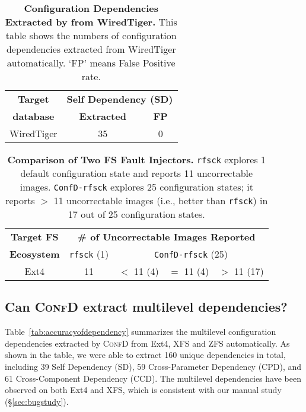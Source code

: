 \begin{table*}[t]
	\small
	\begin{center}
		\begin{tabular}{ c | c | c }
			\textbf{Target } & \multicolumn{2}{c}{\textbf{Self Dependency (SD)}} \\
            \cline{2-3}
		      \textbf{database} & \textbf{Extracted}  &  \textbf{FP}  \\
			\hline
            {WiredTiger}  & 35 & 0   \\
			\hline
		\end{tabular}
	\end{center}
	\caption{ {\bf  Configuration Dependencies Extracted by from WiredTiger.} This table shows the numbers of configuration dependencies extracted from WiredTiger automatically.  `FP' means False Positive rate.}
	\label{tab:wiredtigerdep}
\end{table*}



\begin{table}[t]
	\small
	\begin{center}
		\begin{tabular}{ c | c | c | c | c   }
 	\textbf{Target FS }  &  \multicolumn{4}{c}{\textbf{\# of Uncorrectable Images Reported}}    \\
          \cline{2-5}
           	\textbf{ Ecosystem  }  & {\texttt{rfsck} (1) }  & \multicolumn{3}{c}{{\texttt{ConfD-rfsck} (25)}  }    \\
\hline
Ext4  & 11  & $<$ 11 (4) & $=$ 11 (4) & $>$ 11 (17)   \\
			\hline
 
		\end{tabular}
	\end{center}
	\caption{ {\bf Comparison of Two FS Fault Injectors.} 
\texttt{rfsck} explores 1 default configuration state and reports 11 uncorrectable images. \texttt{ConfD-rfsck} explores 25  configuration states;   it reports 
$>$ 11 uncorrectable images (i.e., better than \texttt{rfsck}) in 17 out of 25 configuration states.}
	\label{tab:result-rfsck}
\end{table}



\subsection{Can \textsc{ConfD} extract multilevel dependencies?}
\label{sec:results-dependencies}

Table~\ref{tab:accuracyofdependency} summarizes the multilevel configuration dependencies extracted by \textsc{ConfD} from Ext4, XFS and ZFS   {automatically}. 
As shown in the table, we were able to extract 160  unique  dependencies in total, including 39 Self Dependency (SD), 59 Cross-Parameter Dependency (CPD), and 61 Cross-Component Dependency (CCD). 
The multilevel dependencies have been observed on  both Ext4 and XFS,  which is consistent with our manual study (\S\ref{sec:bugstudy}).  
 
